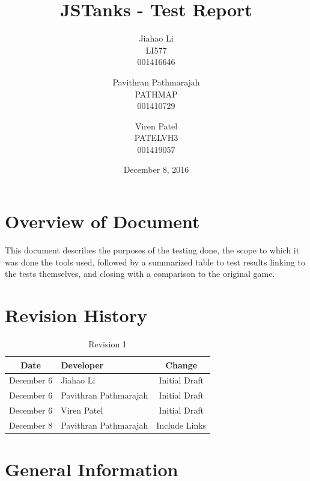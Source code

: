 \documentclass{article}
\begin{document}
\newpage
\title{JSTanks - Test Report}
\date{December 8, 2016}
\author{Jiahao Li\\LI577\\001416646\and Pavithran Pathmarajah\\PATHMAP\\
001410729 \and Viren Patel\\PATELVH3\\001419057}

\maketitle

\newpage
{}
\tableofcontents
\newpage
\listoftables

\newpage
\listoffigures

\newpage


\section*{Overview of Document}
This document describes the purposes of the testing done, the scope to which it was done
the tools used, followed by a summarized table to test results linking to the tests themselves,
and closing with a comparison to the original game. 

\section{Revision History}
\begin{table}[H]
\caption{Revision 1}
	\begin{tabularx}{\textwidth}{cXc}
		\toprule
		Date & Developer & Change\\
		\midrule
		December 6&Jiahao Li &Initial Draft \\
		December 6&Pavithran Pathmarajah &Initial Draft\\
		December 6&Viren Patel  &Initial Draft\\
		\midrule
		December 8&Pavithran Pathmarajah &Include Links\\
	\end{tabularx}
\end{table}




\section{General Information}
\end{document}
